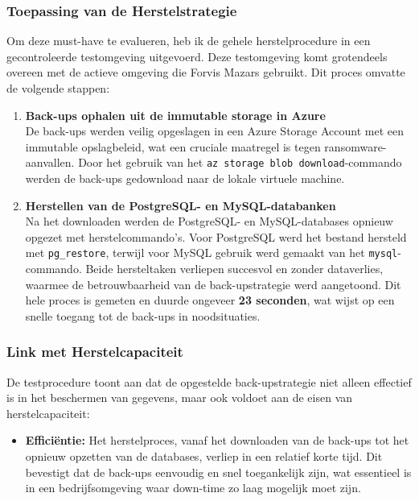 \begin{itemize}
\subsubsection{Toepassing van de Herstelstrategie}
Om deze must-have te evalueren, heb ik de gehele herstelprocedure in een gecontroleerde testomgeving uitgevoerd. Deze testomgeving komt grotendeels overeen met de actieve omgeving die Forvis Mazars gebruikt. Dit proces omvatte de volgende stappen:

\begin{enumerate}
    \item \textbf{Back-ups ophalen uit de immutable storage in Azure} \\
    De back-ups werden veilig opgeslagen in een Azure Storage Account met een immutable opslagbeleid, wat een cruciale maatregel is tegen ransomware-aanvallen. Door het gebruik van het \texttt{az storage blob download}-commando werden de back-ups gedownload naar de lokale virtuele machine.
    
    \item \textbf{Herstellen van de PostgreSQL- en MySQL-databanken} \\
    Na het downloaden werden de PostgreSQL- en MySQL-databases opnieuw opgezet met herstelcommando’s. Voor PostgreSQL werd het bestand hersteld met \texttt{pg\_restore}, terwijl voor MySQL gebruik werd gemaakt van het \texttt{mysql}-commando. Beide hersteltaken verliepen succesvol en zonder dataverlies, waarmee de betrouwbaarheid van de back-upstrategie werd aangetoond. Dit hele proces is gemeten en duurde ongeveer \textbf{23 seconden}, wat wijst op een snelle toegang tot de back-ups in noodsituaties.
\end{enumerate}

\subsubsection{Link met Herstelcapaciteit}
De testprocedure toont aan dat de opgestelde back-upstrategie niet alleen effectief is in het beschermen van gegevens, maar ook voldoet aan de eisen van herstelcapaciteit:

\begin{itemize}
    \item \textbf{Efficiëntie:} Het herstelproces, vanaf het downloaden van de back-ups tot het opnieuw opzetten van de databases, verliep in een relatief korte tijd. Dit bevestigt dat de back-ups eenvoudig en snel toegankelijk zijn, wat essentieel is in een bedrijfsomgeving waar down-time zo laag mogelijk moet zijn.
    

\end{itemize}
\end{itemize}
